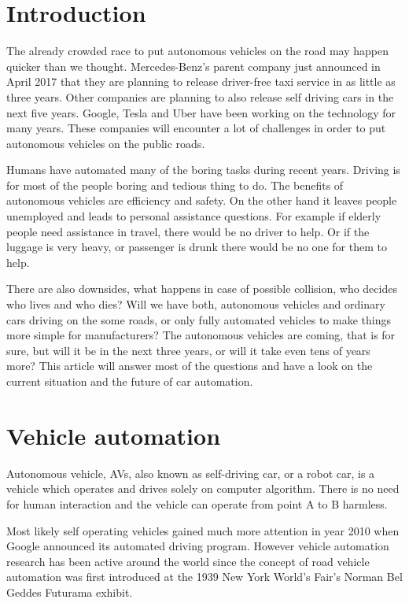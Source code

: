 \documentclass[english]{tktltiki}
\begin{document}
\mytableofcontents

\section{Introduction}
The already crowded race to put autonomous vehicles on the road may happen 
quicker than we thought. Mercedes-Benz's parent company just announced in April 
2017 \cite{mercedes} that they are planning to release driver-free taxi service in as little as 
three years. Other companies are planning to also release self 
driving cars in the next five years. Google, Tesla and Uber have been working on 
the technology for many years. These companies will encounter a lot of 
challenges in order to put autonomous vehicles on the public roads. 

Humans have automated many of the boring tasks during recent years. Driving is 
for most of the people boring and tedious thing to do. The benefits of 
autonomous vehicles are efficiency and safety. On the other hand it leaves 
people unemployed and leads to personal assistance questions. For example if 
elderly people need assistance in travel, there would be no driver to help. Or 
if the luggage is very heavy, or passenger is drunk there would be no one for 
them to help. 

There are also downsides, what happens in case of possible collision, who 
decides who lives and who dies? Will we have both, autonomous vehicles and 
ordinary cars driving on the some roads, or only fully automated vehicles to 
make things more simple for manufacturers? The autonomous vehicles are coming, 
that is for sure, but will it be in the next three years, or will it take even 
tens of years more? This article will answer most of the questions and have a 
look on the current situation and the future of car automation.

\section{Vehicle automation}
Autonomous vehicle, AVs, also known as self-driving car, or a robot car, is a 
vehicle which operates and drives solely on computer algorithm. There is no need 
for human interaction and the vehicle can operate from point A to B harmless. 

Most likely self operating vehicles gained much more attention in year 2010 when 
Google announced its automated driving program. \cite{heavyvehicle} However vehicle automation 
research has been active around the world since the concept of road vehicle 
automation was first introduced at the 1939 New York World's Fair's Norman Bel 
Geddes Futurama exhibit.
\end{document}
